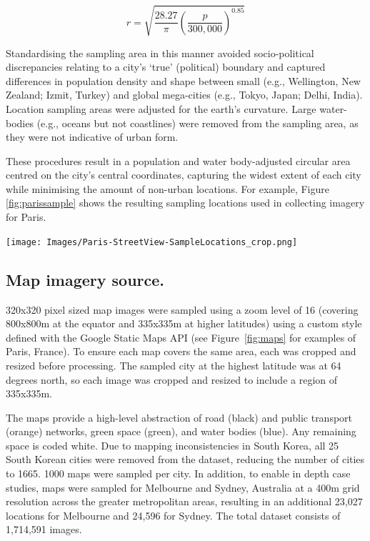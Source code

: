 \documentclass{nature}
\makeatletter
\renewenvironment*{figure}{\@float{figure}}{\end@float}
\makeatother
\begin{document}
\begin{methods}
\begin{equation}
r = \sqrt{ \frac{28.27}{\pi} \left( \frac{p}{300,000}  \right) ^{0.85} }
\end{equation}


Standardising the sampling area in this manner avoided socio-political discrepancies relating to a city's `true' (political) boundary and captured differences in population density and shape between small (e.g., Wellington, New Zealand; Izmit, Turkey) and global mega-cities (e.g., Tokyo, Japan;  Delhi, India). Location sampling areas were adjusted for the earth's curvature\cite{Sinnott1984}. Large water-bodies (e.g., oceans but not coastlines) were removed from the sampling area, as they were not indicative of urban form. 

These procedures result in a population and water body-adjusted circular area centred on the city's central coordinates, capturing the widest extent of each city while minimising the amount of non-urban locations. For example, Figure \ref{fig:parissample} shows the resulting sampling locations used in collecting imagery for Paris. 

\begin{figure}
    \centering    
\texttt{[image: Images/Paris-StreetView-SampleLocations\_crop.png]}  
\caption{\bf Sampling locations for map imagery (from Paris, France)\cite{GoogleStatic2017}.}    
 \label{fig:parissample}  
\end{figure} 



\subsection{Map imagery source.}\label{methodsimagery}

320x320 pixel sized map images were sampled using a zoom level of 16 (covering 800x800m at the equator and 335x335m at higher latitudes) using a custom style defined with the Google Static Maps API\cite{GoogleStatic2017} (see Figure~\ref{fig:maps} for examples of Paris, France). To ensure each map covers the same area, each was cropped and resized before processing. The sampled city at the highest latitude was at 64 degrees north, so each image was cropped and resized to include a region of 335x335m. 

The maps provide a high-level abstraction of road (black) and public transport (orange) networks, green space (green), and water bodies (blue). Any remaining space is coded white. Due to mapping inconsistencies in South Korea, all 25 South Korean cities were removed from the dataset, reducing the number of cities to 1665. 1000 maps were sampled per city. In addition, to enable in depth case studies, maps were sampled for Melbourne and Sydney, Australia at a 400m grid resolution across the greater metropolitan areas, resulting in an additional 23,027 locations for Melbourne and 24,596 for Sydney. The total dataset consists of 1,714,591 images.




\end{methods}
\end{document}

